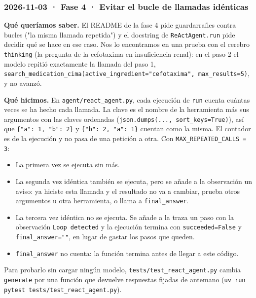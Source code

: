 \subsubsection{2026-11-03 · Fase 4 · Evitar el bucle de llamadas idénticas}

\textbf{Qué queríamos saber.} El README de la fase 4 pide guardarraíles contra bucles ("la misma llamada
repetida") y el docstring de \texttt{ReActAgent.run} pide decidir qué se hace en ese caso. Nos lo
encontramos en una prueba con el cerebro \texttt{thinking} (la pregunta de la cefotaxima en insuficiencia
renal): en el paso 2 el modelo repitió exactamente la llamada del paso 1,
\texttt{search\_\allowbreak{}medication\_\allowbreak{}cima(active\_\allowbreak{}ingredient=\allowbreak{}"cefotaxima", max\_\allowbreak{}results=\allowbreak{}5)}, y no avanzó.

\textbf{Qué hicimos.} En \texttt{agent/\allowbreak{}react\_\allowbreak{}agent.py}, cada ejecución de \texttt{run} cuenta cuántas veces se ha hecho
cada llamada. La clave es el nombre de la herramienta más sus argumentos con las claves ordenadas
(\texttt{json.dumps(..., sort\_\allowbreak{}keys=\allowbreak{}True)}), así que \texttt{\{"a": 1, "b": 2\}} y \texttt{\{"b": 2, "a": 1\}} cuentan como la
misma. El contador es de la ejecución y no pasa de una petición a otra. Con
\texttt{MAX\_\allowbreak{}REPEATED\_\allowbreak{}CALLS =\allowbreak{} 3}:

\begin{itemize}
\tightlist
\item
  La primera vez se ejecuta sin más.
\item
  La segunda vez idéntica también se ejecuta, pero se añade a la observación un aviso: ya hiciste
  esta llamada y el resultado no va a cambiar, prueba otros argumentos u otra herramienta, o llama a
  \texttt{final\_\allowbreak{}answer}.
\item
  La tercera vez idéntica no se ejecuta. Se añade a la traza un paso con la observación
  \texttt{Loop detected} y la ejecución termina con \texttt{succeeded=\allowbreak{}False} y \texttt{final\_\allowbreak{}answer=\allowbreak{}""}, en lugar de
  gastar los pasos que queden.
\item
  \texttt{final\_\allowbreak{}answer} no cuenta: la función termina antes de llegar a este código.
\end{itemize}

Para probarlo sin cargar ningún modelo, \texttt{tests/\allowbreak{}test\_\allowbreak{}react\_\allowbreak{}agent.py} cambia \texttt{generate} por una función
que devuelve respuestas fijadas de antemano (\texttt{uv run pytest tests/\allowbreak{}test\_\allowbreak{}react\_\allowbreak{}agent.py}).

